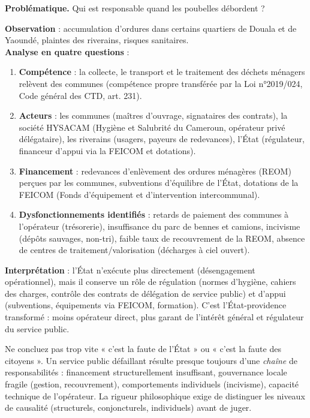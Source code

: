 \documentclass[11pt]{article}
\newcommand{\cle}[1]{{\popxbold\color{popdark}#1}}
\begin{document}
\textbf{Problématique.} Qui est responsable quand les poubelles débordent ?

\begin{experience}
\textbf{Observation} : accumulation d'ordures dans certains quartiers de Douala et de Yaoundé, plaintes des riverains, risques sanitaires.\\
\textbf{Analyse en quatre questions} :
\begin{enumerate}
\item \textbf{Compétence} : la collecte, le transport et le traitement des déchets ménagers relèvent des \cle{communes} (compétence propre transférée par la Loi n°2019/024, Code général des CTD, art. 231).
\item \textbf{Acteurs} : les communes (maîtres d'ouvrage, signataires des contrats), la société HYSACAM (Hygiène et Salubrité du Cameroun, opérateur privé délégataire), les riverains (usagers, payeurs de redevances), l'État (régulateur, financeur d'appui via la FEICOM et dotations).
\item \textbf{Financement} : redevances d'enlèvement des ordures ménagères (REOM) perçues par les communes, subventions d'équilibre de l'État, dotations de la FEICOM (Fonds d'équipement et d'intervention intercommunal).
\item \textbf{Dysfonctionnements identifiés} : retards de paiement des communes à l'opérateur (trésorerie), insuffisance du parc de bennes et camions, incivisme (dépôts sauvages, non-tri), faible taux de recouvrement de la REOM, absence de centres de traitement/valorisation (décharges à ciel ouvert).
\end{enumerate}
\textbf{Interprétation} : l'État n'exécute plus directement (désengagement opérationnel), mais il conserve un rôle de \cle{régulation} (normes d'hygiène, cahiers des charges, contrôle des contrats de délégation de service public) et d'\cle{appui} (subventions, équipements via FEICOM, formation). C'est l'État-providence transformé : moins opérateur direct, plus garant de l'intérêt général et régulateur du service public.
\end{experience}

\begin{attention}
Ne concluez pas trop vite « c'est la faute de l'État » ou « c'est la faute des citoyens ». Un service public défaillant résulte presque toujours d'une \emph{chaîne} de responsabilités : financement structurellement insuffisant, gouvernance locale fragile (gestion, recouvrement), comportements individuels (incivisme), capacité technique de l'opérateur. La rigueur philosophique exige de distinguer les niveaux de causalité (structurels, conjoncturels, individuels) avant de juger.
\end{attention}
\end{document}
